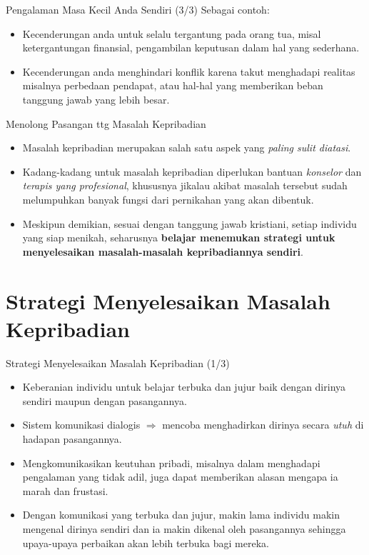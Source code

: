 \documentclass{beamer}
\theoremstyle{mystyle}
\begin{document}
\begin{frame}{Pengalaman Masa Kecil Anda Sendiri (3/3)}
	Sebagai contoh:
	\begin{itemize}
		\item<2-> Kecenderungan anda untuk selalu tergantung pada orang tua, misal ketergantungan finansial, pengambilan keputusan dalam hal yang sederhana.
		\item<3-> Kecenderungan anda menghindari konflik karena takut menghadapi realitas misalnya perbedaan pendapat, atau hal-hal yang memberikan beban tanggung jawab yang lebih besar.
	\end{itemize}
\end{frame}

\begin{frame}{Menolong Pasangan ttg Masalah Kepribadian}
	\begin{itemize}
		\item<2-> Masalah kepribadian merupakan salah satu aspek yang \textit{paling sulit diatasi}.
		\item<3-> Kadang-kadang untuk masalah kepribadian diperlukan bantuan \textit{konselor} dan \textit{terapis yang profesional}, khususnya jikalau akibat masalah tersebut sudah melumpuhkan banyak fungsi dari pernikahan yang akan dibentuk. 
		\item<4-> Meskipun demikian, sesuai dengan tanggung jawab kristiani, setiap individu yang siap menikah, seharusnya \textbf{belajar menemukan strategi untuk menyelesaikan masalah-masalah kepribadiannya sendiri}.
	\end{itemize}
\end{frame}

\section{Strategi Menyelesaikan Masalah Kepribadian}
\begin{frame}{Strategi Menyelesaikan Masalah Kepribadian (1/3)}
	\onslide<2->{\textbf{Keterbukaan dan kejujuran}}
	\begin{itemize}
		\item<3-> Keberanian individu untuk belajar terbuka dan jujur baik dengan dirinya sendiri maupun dengan pasangannya.
		\item<4-> Sistem komunikasi dialogis $\Rightarrow$ mencoba menghadirkan dirinya secara \textit{utuh} di hadapan pasangannya. 
		\item<5-> Mengkomunikasikan keutuhan pribadi, misalnya dalam menghadapi pengalaman yang tidak adil, juga dapat memberikan alasan mengapa ia marah dan frustasi.
		\item<6-> Dengan komunikasi yang terbuka dan jujur, makin lama individu makin mengenal dirinya sendiri dan ia makin dikenal oleh pasangannya sehingga upaya-upaya perbaikan akan lebih terbuka bagi mereka.   
	\end{itemize}
\end{frame}
\end{document}
